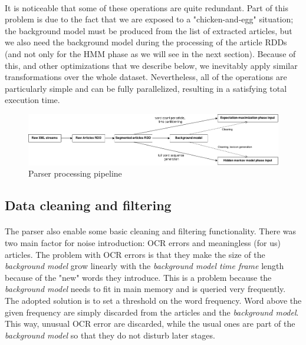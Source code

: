 \paragraph{}
It is noticeable that some of these operations are quite redundant. Part of this problem is due to the fact that we are exposed to a "chicken-and-egg" situation; the background model must be produced from the list of extracted articles, but we also need the background model during the processing of the article RDDs (and not only for the HMM phase as we will see in the next section). Because of this, and other optimizations that we describe below, we inevitably apply similar transformations over the whole dataset. Nevertheless, all of the operations are particularly simple and can be fully parallelized, resulting in a satisfying total execution time.

\begin{figure}
   \includegraphics[width=\textwidth]{parser_processing_steps.png}
   \caption{\label{fig:parser_processing_steps} Parser processing pipeline}
\end{figure}


\subsection{Data cleaning and filtering}
\paragraph{}
The parser also enable some basic cleaning and filtering functionality. There was two main factor for noise introduction: OCR errors and meaningless (for us) articles. The problem with OCR errors is that they make the size of the \emph{background model} grow linearly with the \emph{background model time frame} length because of the "new" words they introduce. This is a problem because the \emph{background model} needs to fit in main memory and is queried very frequently. The adopted solution is to set a threshold on the word frequency. Word above the given frequency are simply discarded from the articles and the \emph{background model}. This way, unusual OCR error are discarded, while the usual ones are part of the \emph{background model} so that they do not disturb later stages.

